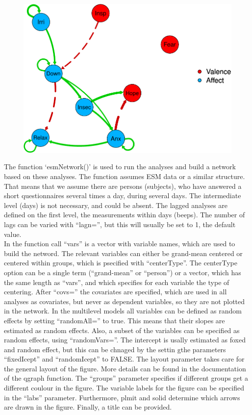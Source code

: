 \documentclass[man,floatsintext]{apa6}
\begin{document}
\begin{figure}
\centering
\includegraphics{networkTutorial_files/figure-latex/example1-1.pdf}
\caption{}
\end{figure}

The function `esmNetwork()' is used to run the analyses and build a
network based on these analyses. The function assumes ESM data or a
similar structure. That means that we assume there are persons
(subjects), who have answered a short questionnaires several times a
day, during several days. The intermediate level (days) is not
necessary, and could be absent. The lagged analyses are defined on the
first level, the measurements within days (beeps). The number of lags
can be varied with \enquote{lagn=}, but this will usually be set to 1,
the default value.\\
In the function call \enquote{vars} is a vector with variable names,
which are used to build the netword. The relevant variables can either
be grand-mean centered or centered within groups, which is psecified
with \enquote{centerType}. The centerType option can be a single term
(\enquote{grand-mean} or \enquote{person}) or a vector, which has the
same length as \enquote{vars}, and which specifies for each variable the
type of centering. After \enquote{covs=} the covariates are specified,
which are used in all analyses as covariates, but never as dependent
variables, so they are not plotted in the network. In the multilevel
models all variables can be defined as random effects by setting
\enquote{randomAll=} to true. This means that their slopes are estimated
as random effects. Also, a subset of the variables can be specified as
random effects, using \enquote{randomVars=}. The intercept is usally
estimated as foxed and random effect, but this can be chnaged by the
settin gthe parameters \enquote{fixedIcept} and \enquote{randomIcept} to
FALSE. The layout parameter takes care for the general layout of the
figure. More details can be found in the documentation of the qgraph
function. The \enquote{groups} parameter specifies if different groups
get a different coulour in the figure. The variable labels for the
figure can be specified in the \enquote{labs} parameter. Furthermore,
plmit and solid determine which arrows are drawn in the figure. Finally,
a title can be provided.
\end{document}
